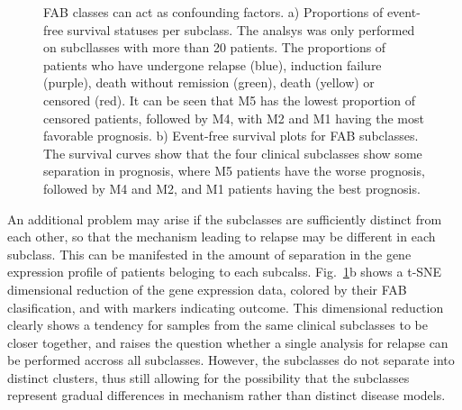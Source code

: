 \documentclass[10pt, letterpaper, twoside, english]{article}
\begin{document}
\begin{figure}
\begin{center}
\end{center}
\caption{FAB classes can act as confounding factors.
a) Proportions of event-free survival statuses per subclass.
The analsys was only performed on subcllasses with more than 20 patients.
The proportions of patients who have undergone relapse (blue), induction failure (purple),
death without remission (green), death (yellow) or censored (red).
It can be seen that M5 has the lowest proportion of censored patients, 
followed by M4, with M2 and M1 having the most favorable prognosis.
b) Event-free survival plots for FAB subclasses.
The survival curves show that the four clinical subclasses show some separation in prognosis,
where M5 patients have the worse prognosis, followed by M4 and M2, and M1 patients having the best prognosis.
}
\label{fig:FABconfounding}
\end{figure}


An additional problem may arise if the subclasses are sufficiently distinct from each other,
so that the mechanism leading to relapse may be different in each subclass.
This can be manifested in the amount of separation in the gene expression profile of patients
beloging to each subcalss. 
Fig.~\ref{fig:FABconfounding}b shows a t-SNE dimensional reduction of the gene expression data,
colored by their FAB clasification,
and with markers indicating outcome.
This dimensional reduction clearly shows a tendency for samples from the same clinical subclasses
to be closer together,
and raises the question whether a single analysis for relapse can be performed accross all subclasses.
However, the subclasses do not separate into distinct clusters,
thus still allowing for the possibility that the subclasses represent gradual differences
in mechanism rather than distinct disease models.
\end{document}
